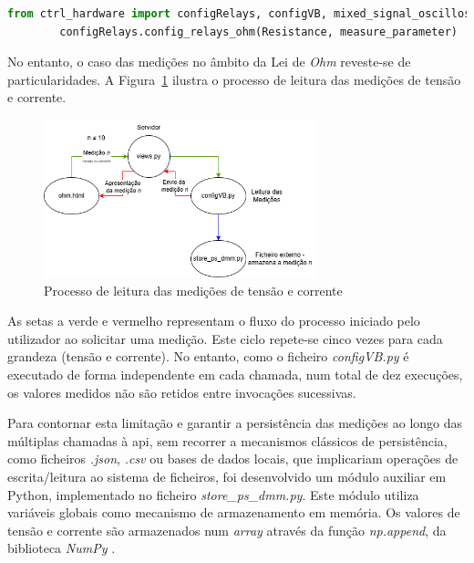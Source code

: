 \begin{minipage}{0.9\linewidth}
	\begin{lstlisting}[language=python, escapechar=|, caption=Comunicação \textit{python} - \textit{python}, label=lst:pypy]
		from ctrl_hardware import configRelays, configVB, mixed_signal_oscilloscope |\label{line:ficheiros}|
		configRelays.config_relays_ohm(Resistance, measure_parameter) |\label{line:trueparameter}|
	\end{lstlisting}
\end{minipage}

No entanto, o caso das medições no âmbito da Lei de \textit{Ohm} reveste-se de particularidades. A Figura~\ref{fig:processoleituraUI} ilustra o processo de leitura das medições de tensão e corrente.

\begin{figure}[hbtp]
	\centering
	\includegraphics[width=0.7\textwidth]{figures/medicoes_OHM.drawio.png}
	\caption{Processo de leitura das medições de tensão e corrente}
	\label{fig:processoleituraUI}
\end{figure}

As setas a verde e vermelho representam o fluxo do processo iniciado pelo utilizador ao solicitar uma medição. Este ciclo repete-se cinco vezes para cada grandeza (tensão e corrente). No entanto, como o ficheiro \textit{configVB.py} é executado de forma independente em cada chamada, num total de dez execuções, os valores medidos não são retidos entre invocações sucessivas.

Para contornar esta limitação e garantir a persistência das medições ao longo das múltiplas chamadas à \acrshort{api}, sem recorrer a mecanismos clássicos de persistência, como ficheiros \textit{.json}, \textit{.csv} ou bases de dados locais, que implicariam operações de escrita/leitura ao sistema de ficheiros, foi desenvolvido um módulo auxiliar em Python, implementado no ficheiro \textit{store\_ps\_dmm.py}. Este módulo utiliza variáveis globais como mecanismo de armazenamento em memória. Os valores de tensão e corrente são armazenados num \textit{array} através da função \textit{np.append}, da biblioteca \textit{NumPy} \cite{NumPy}.

